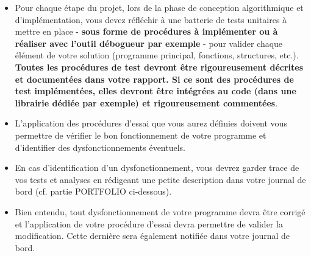 \documentclass[10pt, fleqn, a4paper]{article}
\newcommand{\bfcolor}[2]{\textcolor{#1}{\textbf{#2}}}
\begin{document}
{\begin{minipage}[l]{\textwidth}

\begin{itemize}
\item[\ding{223}] Pour chaque étape du projet, lors de la phase de conception algorithmique et d'implémentation, vous devez réfléchir à une batterie de tests unitaires à mettre en place - \textbf{sous forme de procédures à implémenter ou à réaliser avec l'outil \bfcolor{greenC2}{débogueur} par exemple} - pour valider chaque élément de votre solution (programme principal, fonctions, structures, etc.). \bfcolor{redCM}{Toutes les procédures de test devront être rigoureusement décrites et documentées dans votre rapport. Si ce sont des procédures de test implémentées, elles devront être intégrées au code (dans une librairie dédiée par exemple) et rigoureusement commentées}.
\end{itemize}


\begin{itemize}
\item[\ding{223}] L'application des procédures d'essai que vous aurez définies doivent vous permettre de vérifier le bon fonctionnement de votre programme et d'identifier des dysfonctionnements éventuels.
\end{itemize}


\begin{itemize}
\item[\ding{223}] En cas d'identification d'un dysfonctionnement, vous devrez garder trace de vos tests et analyses en rédigeant une petite description dans votre \colorbox{yellowPORTFOLIO}{journal de bord} (cf. partie \colorbox{yellowPORTFOLIO}{PORTFOLIO} ci-dessous).
\end{itemize}


\begin{itemize}
\item[\ding{223}] Bien entendu, tout dysfonctionnement de votre programme devra être corrigé et l'application de votre procédure d'essai devra permettre de valider la modification. Cette dernière sera également notifiée dans votre \colorbox{yellowPORTFOLIO}{journal de bord}.
\end{itemize}
\end{minipage}}
\end{document}
